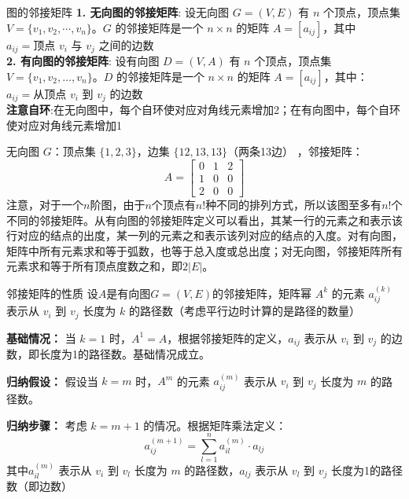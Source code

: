 \begin{definition}{图的邻接矩阵}{}
\textbf{1. 无向图的邻接矩阵}:
设无向图 $G = (V, E)$ 有 $n$ 个顶点，顶点集 $V = \{v_1, v_2, \cdots, v_n\}$。$G$ 的邻接矩阵是一个 $n \times n$ 的矩阵 $A = [a_{ij}]$，其中$a_{ij} = \text{顶点 } v_i \text{ 与 } v_j \text{ 之间的边数}$\\
\textbf{2. 有向图的邻接矩阵}:
设有向图 $D = (V, A)$ 有 $n$ 个顶点，顶点集 $V = \{v_1, v_2, \ldots, v_n\}$。$D$ 的邻接矩阵是一个 $n \times n$ 的矩阵 $A = [a_{ij}]$，其中：$a_{ij} = \text{从顶点 } v_i \text{ 到 } v_j \text{ 的边数}$\\
\textbf{注意自环}:在无向图中，每个自环使对应对角线元素增加2；在有向图中，每个自环使对应对角线元素增加1
\end{definition}
无向图 $G$：顶点集 $\{1,2,3\}$，边集 $\{12, 13, 13\}$（两条13边） ，邻接矩阵：\[
A = \begin{bmatrix}
0 & 1 & 2 \\
1 & 0 & 0 \\
2 & 0 & 0
\end{bmatrix}\]
注意，对于一个$n$阶图，由于$n$个顶点有$n!$种不同的排列方式，所以该图至多有$n!$个不同的邻接矩阵。从有向图的邻接矩阵定义可以看出，其某一行的元素之和表示该行对应的结点的出度，某一列的元素之和表示该列对应的结点的入度。对有向图，矩阵中所有元素求和等于弧数，也等于总入度或总出度；对无向图，邻接矩阵所有元素求和等于所有顶点度数之和，即$2|E|$。
\begin{theorem}{邻接矩阵的性质}{}
设$A$是有向图$G=(V,E)$的邻接矩阵，矩阵幂 $A^k$ 的元素 $a_{ij}^{(k)}$ 表示从 $v_i$ 到 $v_j$ 长度为 $k$ 的路径数（考虑平行边时计算的是路径的数量）
\end{theorem}
\textbf{基础情况：} 当 $k=1$ 时，$A^1 = A$，根据邻接矩阵的定义，$a_{ij}$ 表示从 $v_i$ 到 $v_j$ 的边数，即长度为1的路径数。基础情况成立。

\textbf{归纳假设：} 假设当 $k = m$ 时，$A^m$ 的元素 $a_{ij}^{(m)}$ 表示从 $v_i$ 到 $v_j$ 长度为 $m$ 的路径数。

\textbf{归纳步骤：} 考虑 $k = m+1$ 的情况。根据矩阵乘法定义：
\[
a_{ij}^{(m+1)} = \sum_{l=1}^{n} a_{il}^{(m)} \cdot a_{lj}
\]
其中$a_{il}^{(m)}$ 表示从 $v_i$ 到 $v_l$ 长度为 $m$ 的路径数，$a_{lj}$ 表示从 $v_l$ 到 $v_j$ 长度为1的路径数（即边数）

